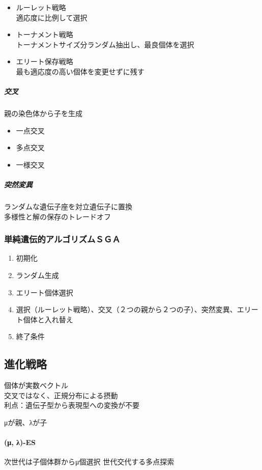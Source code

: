 \documentclass[twocolumn]{jarticle}     %
\begin{document}
\begin{itemize}
  \item ルーレット戦略\\
  適応度に比例して選択
  \item トーナメント戦略\\
  トーナメントサイズ分ランダム抽出し、最良個体を選択
  \item エリート保存戦略\\
  最も適応度の高い個体を変更せずに残す
\end{itemize}

\subparagraph{交叉}
親の染色体から子を生成
\begin{itemize}
  \item 一点交叉
  \item 多点交叉
  \item 一様交叉
\end{itemize}

\subparagraph{突然変異}
ランダムな遺伝子座を対立遺伝子に置換\\
多様性と解の保存のトレードオフ

\subsubsection{単純遺伝的アルゴリズムＳＧＡ}
\begin{enumerate}
  \item  初期化
  \item ランダム生成
  \item エリート個体選択
  \item 選択（ルーレット戦略）、交叉（２つの親から２つの子）、突然変異、エリート個体と入れ替え
  \item 終了条件
\end{enumerate}


\subsection{進化戦略}
個体が実数ベクトル\\
交叉ではなく、正規分布による摂動\\
利点：遺伝子型から表現型への変換が不要

μが親、λが子\\

\paragraph{(μ, λ)-ES}
次世代は子個体群からμ個選択
世代交代する多点探索
\end{document}
